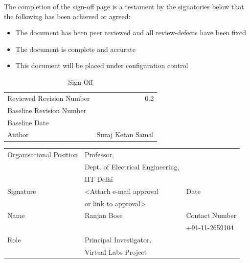 \documentclass[11pt]{article}
\begin{document}
The completion of the sign-off page is a testament by the signatories
below that the following has been achieved or agreed:
\begin{itemize}
\item The document has been peer reviewed and all review-defects have been fixed
\item The document is complete and accurate
\item This document will be placed under configuration control
\end{itemize}
\begin{table}[H]
\caption{\label{tbl: Sign-Off}Sign-Off}
\begin{center}
\begin{tabular}{lr}
\hline
 Reviewed Revision Number  &                0.2  \\
 Baseline Revision Number  &                     \\
 Baseline Date             &                     \\
 Author                    &  Suraj Ketan Samal  \\
\hline
\end{tabular}
\end{center}
\end{table}

                        


\begin{center}
\begin{tabular}{lll}
\hline
 Organisational Position  &  Professor,                        &                  \\
                          &  Dept. of Electrical Engineering,  &                  \\
                          &  IIT Delhi                         &                  \\
 Signature                &  <Attach e-mail approval           &  Date            \\
                          &  or link to approval>              &                  \\
 Name                     &  Ranjan Bose                       &  Contact Number  \\
                          &                                    &  +91-11-2659104  \\
 Role                     &  Principal Investigator,           &                  \\
                          &  Virtual Labs Project              &                  \\
\hline
\end{tabular}
\end{center}
\end{document}
